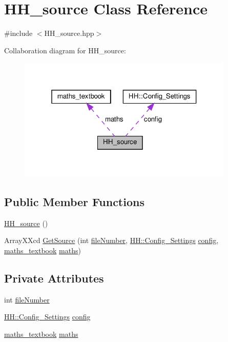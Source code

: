 \hypertarget{class_h_h__source}{}\section{H\+H\+\_\+source Class Reference}
\label{class_h_h__source}


{\ttfamily \#include $<$H\+H\+\_\+source.\+hpp$>$}



Collaboration diagram for H\+H\+\_\+source\+:\nopagebreak
\begin{figure}[H]
\begin{center}
\leavevmode
\includegraphics[width=292pt]{class_h_h__source__coll__graph}
\end{center}
\end{figure}
\subsection*{Public Member Functions}
\begin{DoxyCompactItemize}
\item 
\mbox{\hyperlink{class_h_h__source_a0b3c052d274495b4f90fb09d15fff9fa}{H\+H\+\_\+source}} ()
\item 
Array\+X\+Xcd \mbox{\hyperlink{class_h_h__source_a059c934be1aaa0ed411fea5374bb2428}{Get\+Source}} (int \mbox{\hyperlink{class_h_h__source_a6631481cc1bea05ab564cb1841644a12}{file\+Number}}, \mbox{\hyperlink{class_h_h_1_1_config___settings}{H\+H\+::\+Config\+\_\+\+Settings}} \mbox{\hyperlink{class_h_h__source_adbab95c09c583e2aeebbb4679e6998e8}{config}}, \mbox{\hyperlink{classmaths__textbook}{maths\+\_\+textbook}} \mbox{\hyperlink{class_h_h__source_a93637ad30af846dd04eb741437114f8f}{maths}})
\end{DoxyCompactItemize}
\subsection*{Private Attributes}
\begin{DoxyCompactItemize}
\item 
int \mbox{\hyperlink{class_h_h__source_a6631481cc1bea05ab564cb1841644a12}{file\+Number}}
\item 
\mbox{\hyperlink{class_h_h_1_1_config___settings}{H\+H\+::\+Config\+\_\+\+Settings}} \mbox{\hyperlink{class_h_h__source_adbab95c09c583e2aeebbb4679e6998e8}{config}}
\item 
\mbox{\hyperlink{classmaths__textbook}{maths\+\_\+textbook}} \mbox{\hyperlink{class_h_h__source_a93637ad30af846dd04eb741437114f8f}{maths}}
\end{DoxyCompactItemize}


